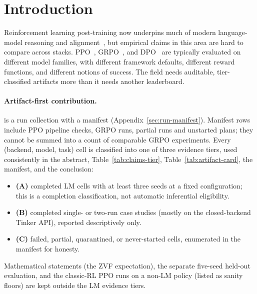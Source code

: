 \section{Introduction}
\label{sec:intro}

Reinforcement learning post-training now underpins much of modern
language-model reasoning and alignment~\citep{ouyang2022training,%
guo2025deepseekr1nature}, but empirical claims in this area are hard to
compare across stacks. PPO~\citep{schulman2017proximal},
GRPO~\citep{shao2024deepseekmath}, and DPO~\citep{rafailov2024direct} are
typically evaluated on different model families, with different framework
defaults, different reward functions, and different notions of success. The
field needs auditable, tier-classified artifacts more than it needs another
leaderboard.

\paragraph{Artifact-first contribution.}
\ours{} is a run collection with a manifest
(Appendix~\ref{sec:run-manifest}). Manifest rows include PPO pipeline
checks, GRPO runs, partial runs and unstarted plans; they cannot be summed
into a count of comparable GRPO experiments. Every (backend, model, task)
cell is classified into one of three evidence tiers, used consistently in
the abstract, Table~\ref{tab:claims-tier}, Table~\ref{tab:artifact-card},
the manifest, and the conclusion:
\begin{itemize}\setlength\itemsep{1pt}
  \item \textbf{(A)} completed LM cells with at least three seeds at a fixed
        configuration; this is a completion classification, not automatic
        inferential eligibility.
  \item \textbf{(B)} completed single- or two-run case studies (mostly on
        the closed-backend Tinker API), reported descriptively only.
  \item \textbf{(C)} failed, partial, quarantined, or never-started cells,
        enumerated in the manifest for honesty.
\end{itemize}
Mathematical statements (the ZVF expectation), the separate five-seed
held-out evaluation, and the classic-RL PPO runs on a non-LM policy (listed
as sanity floors) are kept outside the LM evidence tiers.

